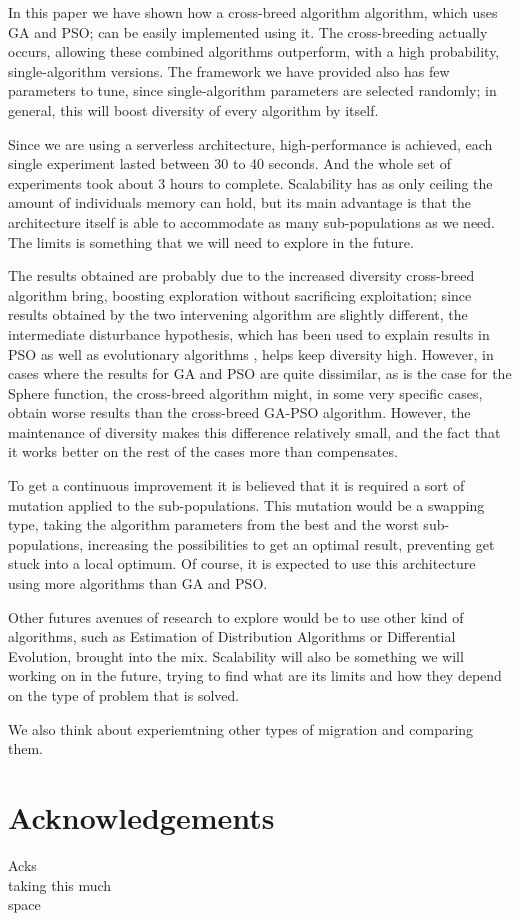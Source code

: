 \documentclass[runningheads]{llncs}
\begin{document}
In this paper we have shown how a cross-breed algorithm algorithm,
which uses GA and PSO; can be easily implemented using it. The
cross-breeding actually occurs, allowing these combined algorithms
outperform, with a high probability, single-algorithm
versions. The framework we have provided also has few parameters to
tune, since single-algorithm parameters are selected randomly; in
general, this will boost diversity of every algorithm by itself. 

Since we are using a serverless architecture, high-performance is
achieved, each single experiment lasted between 30 to 40 seconds.
And the whole set of experiments took about 3 hours to complete.
Scalability has as only ceiling the amount of individuals memory can
hold, but its main advantage is that the architecture itself is able
to accommodate as many sub-populations as we need. The limits is
something that we will need to explore in the future. 

The results obtained are probably due to the increased diversity
cross-breed algorithm bring, boosting exploration without sacrificing
exploitation; since results obtained by 
the two intervening algorithm are slightly different, the intermediate
disturbance hypothesis, which has been used to explain results in PSO
\cite{gao2013particle} as well as evolutionary algorithms
\cite{merelo2008testing},  helps keep diversity high. However, in
cases 
where the results for GA and PSO are quite dissimilar, as is the case
for the Sphere function, the cross-breed algorithm might, in some very
specific cases, obtain worse results than the cross-breed  GA-PSO
algorithm. However, the maintenance of diversity makes this difference
relatively small, and the fact that it works better on the rest of the
cases more than compensates.

To get a continuous improvement it is believed that it is required a sort of
mutation applied to the sub-populations. This mutation would be a swapping type,
taking the algorithm parameters from the best and the worst sub-populations,
increasing the possibilities to get an optimal result, preventing get stuck into
a local optimum. Of course, it is expected to use this architecture using more
algorithms than GA and PSO.

Other futures avenues of research to explore would be to use other
kind of algorithms, such as Estimation of Distribution Algorithms or
Differential Evolution, brought into the mix. Scalability will also be
something we will working on in the future, trying to find what are
its limits and how they depend on the type of problem that is solved.

We also think about experiemtning other types of migration and comparing them. 


\section*{Acknowledgements}

Acks\\
taking this much\\
space



  
\end{document}
